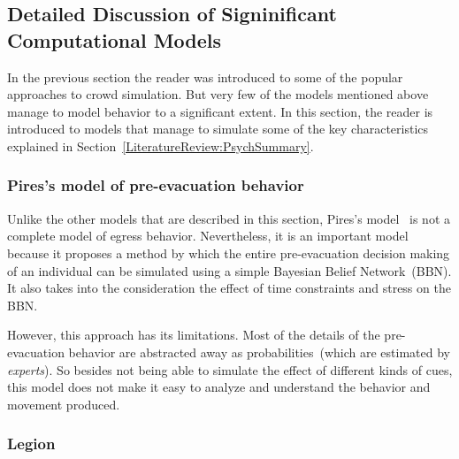 \subsection{Detailed Discussion of Signinificant Computational Models}
\label{LiteratureReview:DetailedModels}

In the previous section the reader was introduced to some of the popular approaches to crowd simulation. But very few of the models mentioned above manage to model behavior to a significant extent. In this section, the reader is introduced to models that manage to simulate some of the key characteristics explained in Section~\ref{LiteratureReview:PsychSummary}.

\subsubsection{Pires's model of pre-evacuation behavior}
Unlike the other models that are described in this section, Pires's model~\cite{Pires:2005gs} is not a complete model of egress behavior. Nevertheless, it is an important model because it proposes a method by which the entire pre-evacuation decision making of an individual can be simulated using a simple Bayesian Belief Network~(BBN). It also takes into the consideration the effect of time constraints and stress on the BBN.

However, this approach has its limitations. Most of the details of the pre-evacuation behavior are abstracted away as probabilities~(which are estimated by \emph{experts}). So besides not being able to simulate the effect of different kinds of cues, this model does not make it easy to analyze and understand the behavior and movement produced.

\subsubsection{Legion}

